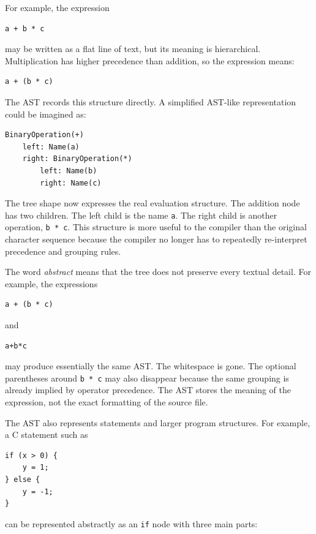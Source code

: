 For example, the expression

\begin{verbatim}
a + b * c
\end{verbatim}

may be written as a flat line of text, but its meaning is hierarchical. Multiplication has higher precedence than addition, so the expression means:

\begin{verbatim}
a + (b * c)
\end{verbatim}

The AST records this structure directly. A simplified AST-like representation could be imagined as:

\begin{verbatim}
BinaryOperation(+)
    left: Name(a)
    right: BinaryOperation(*)
        left: Name(b)
        right: Name(c)
\end{verbatim}

The tree shape now expresses the real evaluation structure. The addition node has two children. The left child is the name \texttt{a}. The right child is another operation, \texttt{b * c}. This structure is more useful to the compiler than the original character sequence because the compiler no longer has to repeatedly re-interpret precedence and grouping rules.

The word \emph{abstract} means that the tree does not preserve every textual detail. For example, the expressions

\begin{verbatim}
a + (b * c)
\end{verbatim}

and

\begin{verbatim}
a+b*c
\end{verbatim}

may produce essentially the same AST. The whitespace is gone. The optional parentheses around \texttt{b * c} may also disappear because the same grouping is already implied by operator precedence. The AST stores the meaning of the expression, not the exact formatting of the source file.

The AST also represents statements and larger program structures. For example, a C statement such as

\begin{verbatim}
if (x > 0) {
    y = 1;
} else {
    y = -1;
}
\end{verbatim}

can be represented abstractly as an \texttt{if} node with three main parts:

